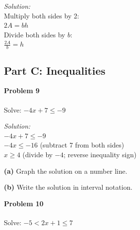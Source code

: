 \documentclass[12pt]{article}
\begin{document}
            \textit{Solution:}\\
            Multiply both sides by 2:\\
            $2A = bh$\\
            Divide both sides by $b$:\\
            $\displaystyle\frac{2A}{b} = h$


            \newpage

            \subsection*{Part C: Inequalities}

            \textbf{Problem 9}\\\\
            Solve: $-4x + 7 \leq -9$

            \textit{Solution:}\\
            $-4x + 7 \leq -9$\\
            $-4x \leq -16$ \quad (subtract 7 from both sides)\\
            $x \geq 4$ \quad (divide by $-4$; reverse inequality sign)


            \textbf{(a)} Graph the solution on a number line.

            \begin{center}
            \end{center}

            \textbf{(b)} Write the solution in interval notation.

            \fbox{Answer: $[4, \infty)$}

            \vspace{0.5cm}

            \textbf{Problem 10}\\\\
            Solve: $-5 < 2x + 1 \leq 7$
\end{document}
